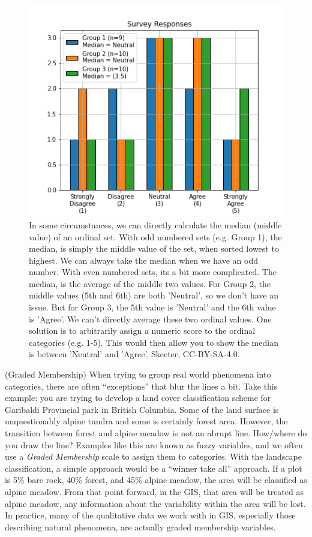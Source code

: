 \documentclass[
]{book}
\begin{document}
\begin{figure}
\includegraphics[width=0.75\linewidth]{images/03-ordinal-operatons} \caption{In some circumstances, we can directly calculate the median (middle value) of an ordinal set.  With odd numbered sets (e.g. Group 1), the median, is simply the middle value of the set, when sorted lowest to highest.  We can always take the median when we have an odd number.  With even numbered sets, its a bit more complicated.  The median, is the average of the middle two values.  For Group 2, the middle values (5th and 6th) are both 'Neutral', so we don't have an issue.  But for Group 3, the 5th value is 'Neutral' and the 6th value is 'Agree'.  We can't directly average these two ordinal values.  One solution is to arbitrarily assign a numeric score to the ordinal categories (e.g. 1-5).  This would then allow you to show the median is between 'Neutral' and 'Agree'. Skeeter, CC-BY-SA-4.0.}\label{fig:3-ordinal-operatons}
\end{figure}

(Graded Membership) When trying to group real world phenomena into categories, there are often ``exceptions'' that blur the lines a bit. Take this example: you are trying to develop a land cover classification scheme for Garibaldi Provincial park in British Columbia. Some of the land surface is unquestionably alpine tundra and some is certainly forest area. However, the transition between forest and alpine meadow is not an abrupt line. How/where do you draw the line? Examples like this are known as fuzzy variables, and we often use a \emph{Graded Membership} scale to assign them to categories. With the landscape classification, a simple approach would be a ``winner take all'' approach. If a plot is 5\% bare rock, 40\% forest, and 45\% alpine meadow, the area will be classified as alpine meadow. From that point forward, in the GIS, that area will be treated as alpine meadow, any information about the variability within the area will be lost. In practice, many of the qualitative data we work with in GIS, especially those describing natural phenomena, are actually graded membership variables.
\end{document}
